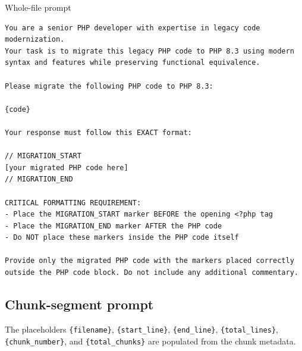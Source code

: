 \begin{promptbox}{Whole-file prompt}
\noindent\begin{Verbatim}[breaklines=true,breakanywhere=true,fontsize=\footnotesize]
You are a senior PHP developer with expertise in legacy code modernization.
Your task is to migrate this legacy PHP code to PHP 8.3 using modern syntax and features while preserving functional equivalence.

Please migrate the following PHP code to PHP 8.3:

{code}

Your response must follow this EXACT format:

// MIGRATION_START
[your migrated PHP code here]
// MIGRATION_END

CRITICAL FORMATTING REQUIREMENT:
- Place the MIGRATION_START marker BEFORE the opening <?php tag
- Place the MIGRATION_END marker AFTER the PHP code
- Do NOT place these markers inside the PHP code itself

Provide only the migrated PHP code with the markers placed correctly outside the PHP code block. Do not include any additional commentary.
\end{Verbatim}
\end{promptbox}

\subsection{Chunk-segment prompt}

The placeholders \texttt{\{filename\}}, \texttt{\{start\_line\}}, \texttt{\{end\_line\}}, \texttt{\{total\_lines\}}, \texttt{\{chunk\_number\}}, and \texttt{\{total\_chunks\}} are populated from the chunk metadata.

